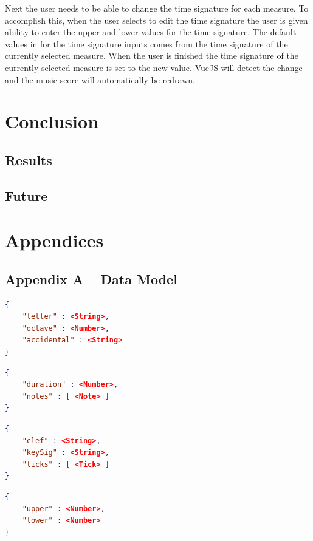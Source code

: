 \documentclass[letterpaper,12pt]{article}
\begin{document}
Next the user needs to be able to change the time signature for each measure. To accomplish this, when the user selects
to edit the time signature the user is given ability to enter the upper and lower values for the time signature. The
default values in for the time signature inputs comes from the time signature of the currently selected measure. When
the user is finished the time signature of the currently selected measure is set to the new value. VueJS will detect the
change and the music score will automatically be redrawn.



\section{Conclusion}

\subsection{Results}

\subsection{Future}

\newpage

\section{Appendices}

\subsection{Appendix A -- Data Model}

\begin{lstlisting}[language=json, caption=Note]
{
    "letter" : <String>,
    "octave" : <Number>,
    "accidental" : <String>
}
\end{lstlisting}

\begin{lstlisting}[language=json, caption=Tick]
{
    "duration" : <Number>,
    "notes" : [ <Note> ]
}
\end{lstlisting}

\begin{lstlisting}[language=json, caption=Bar]
{
    "clef" : <String>,
    "keySig" : <String>,
    "ticks" : [ <Tick> ]
}
\end{lstlisting}

\begin{lstlisting}[language=json, caption=TimeSignature]
{
    "upper" : <Number>,
    "lower" : <Number>
}
\end{lstlisting}
\end{document}

